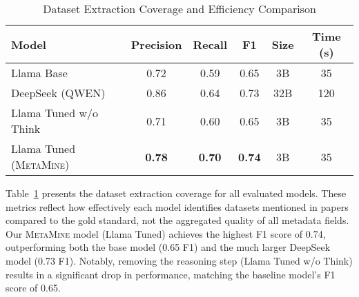 \documentclass[runningheads]{llncs}
\begin{document}
\begin{table}[t]
\centering
\caption{Dataset Extraction Coverage and Efficiency Comparison}
\label{tab:overall_performance}
\begin{tabular}{lccccc}
\toprule
\textbf{Model} & \textbf{Precision} & \textbf{Recall} & \textbf{F1} & \textbf{Size} & \textbf{Time (s)} \\
\midrule
Llama Base & 0.72 & 0.59 & 0.65 & 3B & 35 \\
DeepSeek (QWEN) & 0.86 & 0.64 & 0.73 & 32B & 120 \\
Llama Tuned w/o Think & 0.71 & 0.60 & 0.65 & 3B & 35 \\
Llama Tuned (\textsc{MetaMine}) & \textbf{0.78} & \textbf{0.70} & \textbf{0.74} & 3B & 35 \\
\bottomrule
\end{tabular}
\end{table}
\noindent 
Table~\ref{tab:overall_performance} presents the dataset extraction coverage for all evaluated models. These metrics reflect how effectively each model identifies datasets mentioned in papers compared to the gold standard, not the aggregated quality of all metadata fields. Our \textsc{MetaMine} model (Llama Tuned) achieves the highest F1 score of 0.74, outperforming both the base model (0.65 F1) and the much larger DeepSeek model (0.73 F1). Notably, removing the reasoning step (Llama Tuned w/o Think) results in a significant drop in performance, matching the baseline model's F1 score of 0.65.
\begin{table}[t]
\centering
\caption{F1 Scores for Individual Metadata Fields Across Models}
\label{tab:field_performance}
\end{table}
\end{document}
